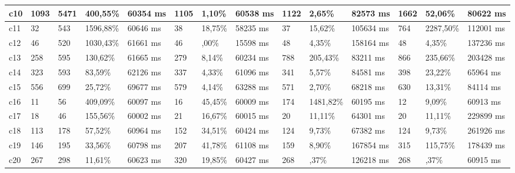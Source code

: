 \begin{table}[]
\begin{adjustbox}{angle=90}
{\begin{tabular}{|c|c|l|l|l|l|l|l|l|l|l|l|l|l|}
\multicolumn{1}{|l|}{c10} & \multicolumn{1}{l|}{1093} &5471 & 400,55\% & 60354 ms  & 1105 & 1,10\% & 60538 ms  & 1122 & 2,65\% & 82573 ms  & 1662 & 52,06\% & 80622 ms \\ \hline
\multicolumn{1}{|l|}{c11} & \multicolumn{1}{l|}{32} &543 & 1596,88\% & 60646 ms  & 38 & 18,75\% & 58235 ms  & 37 & 15,62\% & 105634 ms  & 764 & 2287,50\% & 112001 ms \\ \hline
\multicolumn{1}{|l|}{c12} & \multicolumn{1}{l|}{46} &520 & 1030,43\% & 61661 ms  & 46 & ,00\% & 15598 ms  & 48 & 4,35\% & 158164 ms  & 48 & 4,35\% & 137236 ms \\ \hline
\multicolumn{1}{|l|}{c13} & \multicolumn{1}{l|}{258} &595 & 130,62\% & 61665 ms  & 279 & 8,14\% & 60234 ms  & 788 & 205,43\% & 83211 ms  & 866 & 235,66\% & 203428 ms \\ \hline
\multicolumn{1}{|l|}{c14} & \multicolumn{1}{l|}{323} &593 & 83,59\% & 62126 ms  & 337 & 4,33\% & 61096 ms  & 341 & 5,57\% & 84581 ms  & 398 & 23,22\% & 65964 ms \\ \hline
\multicolumn{1}{|l|}{c15} & \multicolumn{1}{l|}{556} &699 & 25,72\% & 69677 ms  & 579 & 4,14\% & 63288 ms  & 571 & 2,70\% & 68218 ms  & 630 & 13,31\% & 84114 ms \\ \hline
\multicolumn{1}{|l|}{c16} & \multicolumn{1}{l|}{11} &56 & 409,09\% & 60097 ms  & 16 & 45,45\% & 60009 ms  & 174 & 1481,82\% & 60195 ms  & 12 & 9,09\% & 60913 ms \\ \hline
\multicolumn{1}{|l|}{c17} & \multicolumn{1}{l|}{18} &46 & 155,56\% & 60002 ms  & 21 & 16,67\% & 60015 ms  & 20 & 11,11\% & 64301 ms  & 20 & 11,11\% & 229899 ms \\ \hline
\multicolumn{1}{|l|}{c18} & \multicolumn{1}{l|}{113} &178 & 57,52\% & 60964 ms  & 152 & 34,51\% & 60424 ms  & 124 & 9,73\% & 67382 ms  & 124 & 9,73\% & 261926 ms \\ \hline
\multicolumn{1}{|l|}{c19} & \multicolumn{1}{l|}{146} &195 & 33,56\% & 60798 ms  & 207 & 41,78\% & 61108 ms  & 159 & 8,90\% & 167854 ms  & 315 & 115,75\% & 178439 ms \\ \hline
\multicolumn{1}{|l|}{c20} & \multicolumn{1}{l|}{267} &298 & 11,61\% & 60623 ms  & 320 & 19,85\% & 60427 ms  & 268 & ,37\% & 126218 ms  & 268 & ,37\% & 60915 ms \\ \hline

\end{tabular}}
\end{adjustbox}
\end{table}

